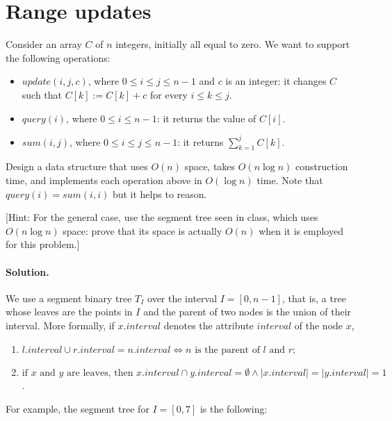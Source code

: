 \section{Range updates}

Consider an array $C$ of $n$ integers, initially all equal to zero. We want to support the following operations:
\begin{itemize}
  \item $update(i, j, c)$, where $0 \leq i \leq j \leq n - 1$ and $c$ is an integer: it changes $C$ such that $C[k] := C[k] + c$ for every $i \leq k \leq j$.
  \item $query(i)$, where $0 \leq i \leq n - 1$: it returns the value of $C[i]$.
  \item $sum(i,j)$, where $0 \leq i \leq j \leq n - 1$: it returns $\sum_{k = 1}^j C[k]$.
\end{itemize}

Design a data structure that uses $O(n)$ space, takes $O(n \log n)$ construction time, and implements each operation above in $O(\log n)$ time. Note that $query(i) = sum(i, i)$ but it helps to reason.

[Hint: For the general case, use the segment tree seen in class, which uses $O(n \log n)$ space: prove that its space is actually $O(n)$ when it is employed for this problem.]

\vspace{0.5cm}
\paragraph{Solution.}
We use a segment binary tree $T_I$ over the interval $I = [0, n - 1]$, that is, a tree whose leaves are the points in $I$ and the parent of two nodes is the union of their interval. More formally, if $x.interval$ denotes the attribute $interval$ of the node $x$,
\begin{enumerate}
  \item $l.interval \cup r.interval = n.interval \iff n \text{ is the parent of $l$ and $r$}$;
  \item $\text{if $x$ and $y$ are leaves, then } x.interval \cap y.interval = \emptyset \wedge |x.interval|=|y.interval|=1$.
\end{enumerate}
For example, the segment tree for $I=[0,7]$ is the following:
\begin{center}
\end{center}

